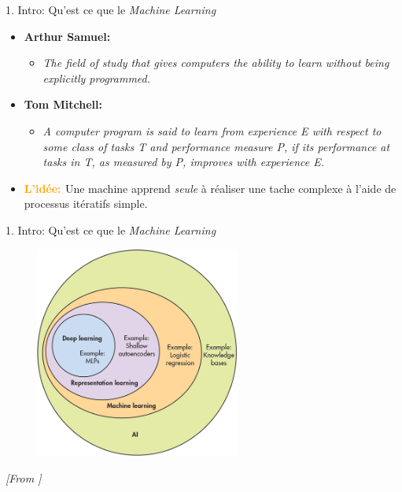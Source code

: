 \begin{frame}{1. Intro: Qu'est ce que le \textit{Machine Learning}}
  \begin{itemize}
  \item \textbf{Arthur Samuel:}
    \begin{itemize}
      \normalsize
    \item \textit{The field of study that gives computers the ability to learn without being explicitly programmed.}
    \end{itemize}
    \vspace{0.2cm}
  \item \textbf{Tom Mitchell:}
    \begin{itemize}
      \normalsize
    \item \textit{A computer program is said to learn from experience E with respect to some class of tasks T and performance measure P, if its performance at tasks in T, as measured by P, improves with experience E.}
    \end{itemize}
    \vspace{0.5cm}
  \item \textbf{\textcolor{orange}{L'idée: }} Une machine apprend \textit{seule} à réaliser une tache complexe à l'aide de processus itératifs simple.
  \end{itemize}
\end{frame}

\begin{frame}{1. Intro: Qu'est ce que le \textit{Machine Learning}}
  \begin{figure}
    \includegraphics[width=0.6\textwidth]{fig/aiVennDiagram.png}
  \end{figure}
  \tiny
  \vspace{-1cm}
  \textit{[From \href{http://www.deeplearningbook.org/}{\color{blue}{MIT Press book Deep Learning}}]}
\end{frame}

